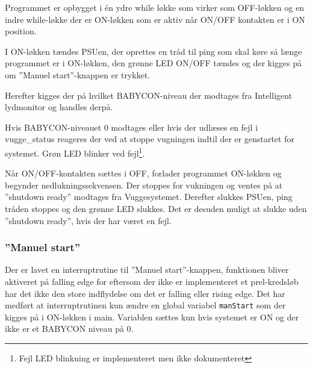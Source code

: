 Programmet er opbygget i én ydre while løkke som virker som OFF-løkken og en indre while-løkke der er ON-løkken som er aktiv når ON/OFF kontakten er i ON position.


I ON-løkken tændes PSUen, der oprettes en tråd til ping som skal køre så længe programmet er i ON-løkken, den grønne LED ON/OFF tændes og der kigges på om ''Manuel start''-knappen er trykket.


Herefter kigges der på hvilket BABYCON-niveau der modtages fra Intelligent lydmonitor og handles derpå.


Hvis BABYCON-niveauet 0 modtages eller hvis der udlæses en fejl i vugge\_status reageres der ved at stoppe vugningen indtil der er genstartet for systemet. Grøn LED blinker ved fejl\footnote{Fejl LED blinkning er implementeret men ikke dokumenteret}.


Når ON/OFF-kontakten sættes i OFF, forlader programmet ON-løkken og begynder nedlukningssekvensen. Der stoppes for vukningen og ventes på at ''shutdown ready'' modtages fra Vuggesystemet. Derefter slukkes PSUen, ping tråden stoppes og den grønne LED slukkes. Det er desuden muligt at slukke uden ''shutdown ready'', hvis der har været en fejl.  


\subsubsection*{''Manuel start''}

Der er lavet en interruptrutine til ''Manuel start''-knappen, funktionen bliver aktiveret på falling edge for eftersom der ikke er implementeret et prel-kredsløb har det ikke den store indflydelse om det er falling eller rising edge. Det har medført at interruptrutinen kun ændre en global variabel \verb+manStart+ som der kigges på i ON-løkken i main. Variablen sættes kun hvis systemet er ON og der ikke er et BABYCON niveau på 0. 


